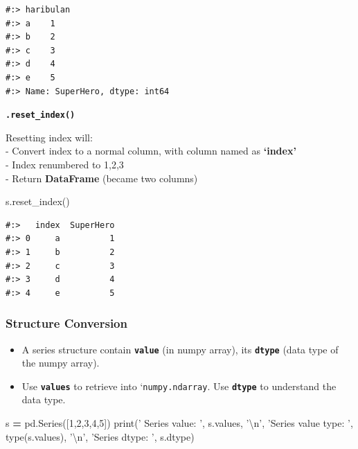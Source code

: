 \documentclass[
]{book}
\newenvironment{Shaded}{\begin{snugshade}}{\end{snugshade}}
\newcommand{\BuiltInTok}[1]{#1}
\newcommand{\CharTok}[1]{\textcolor[rgb]{0.5,0.5,0.5}{#1}}
\newcommand{\DecValTok}[1]{\textcolor[rgb]{0.06,0.06,0.06}{#1}}
\newcommand{\NormalTok}[1]{#1}
\newcommand{\OperatorTok}[1]{\textcolor[rgb]{0.43,0.43,0.43}{\textbf{#1}}}
\newcommand{\StringTok}[1]{\textcolor[rgb]{0.5,0.5,0.5}{#1}}
\providecommand{\tightlist}{%
  \setlength{\itemsep}{0pt}\setlength{\parskip}{0pt}}
\begin{document}
\begin{verbatim}
#:> haribulan
#:> a    1
#:> b    2
#:> c    3
#:> d    4
#:> e    5
#:> Name: SuperHero, dtype: int64
\end{verbatim}

\textbf{\texttt{.reset\_index()}}

Resetting index will:\\
- Convert index to a normal column, with column named as \textbf{`index'}\\
- Index renumbered to 1,2,3\\
- Return \textbf{DataFrame} (became two columns)

\begin{Shaded}
\begin{Highlighting}[]
\NormalTok{s.reset_index()}
\end{Highlighting}
\end{Shaded}

\begin{verbatim}
#:>   index  SuperHero
#:> 0     a          1
#:> 1     b          2
#:> 2     c          3
#:> 3     d          4
#:> 4     e          5
\end{verbatim}

\hypertarget{structure-conversion-1}{%
\subsubsection{Structure Conversion}\label{structure-conversion-1}}

\begin{itemize}
\tightlist
\item
  A series structure contain \textbf{\texttt{value}} (in numpy array), its \textbf{\texttt{dtype}} (data type of the numpy array).\\
\item
  Use \textbf{\texttt{values}} to retrieve into `\texttt{numpy.ndarray}. Use \textbf{\texttt{dtype}} to understand the data type.
\end{itemize}

\begin{Shaded}
\begin{Highlighting}[]
\NormalTok{s }\OperatorTok{=}\NormalTok{ pd.Series([}\DecValTok{1}\NormalTok{,}\DecValTok{2}\NormalTok{,}\DecValTok{3}\NormalTok{,}\DecValTok{4}\NormalTok{,}\DecValTok{5}\NormalTok{])}
\BuiltInTok{print}\NormalTok{(}\StringTok{' Series value:      '}\NormalTok{, s.values, }\StringTok{'}\CharTok{\textbackslash{}n}\StringTok{'}\NormalTok{, }
      \StringTok{'Series value type: '}\NormalTok{,  }\BuiltInTok{type}\NormalTok{(s.values), }\StringTok{'}\CharTok{\textbackslash{}n}\StringTok{'}\NormalTok{,}
      \StringTok{'Series dtype:      '}\NormalTok{,  s.dtype)}
\end{Highlighting}
\end{Shaded}
\end{document}
